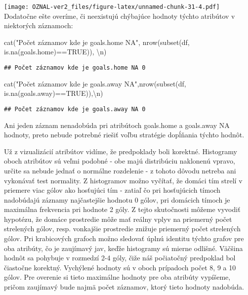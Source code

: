 \documentclass[
]{article}
\newenvironment{Shaded}{\begin{snugshade}}{\end{snugshade}}
\newcommand{\ConstantTok}[1]{\textcolor[rgb]{0.00,0.00,0.00}{#1}}
\newcommand{\FunctionTok}[1]{\textcolor[rgb]{0.00,0.00,0.00}{#1}}
\newcommand{\NormalTok}[1]{#1}
\newcommand{\SpecialCharTok}[1]{\textcolor[rgb]{0.00,0.00,0.00}{#1}}
\newcommand{\StringTok}[1]{\textcolor[rgb]{0.31,0.60,0.02}{#1}}
\begin{document}
\texttt{[image: OZNAL-ver2\_files/figure-latex/unnamed-chunk-31-4.pdf]}
Dodatočne ešte overíme, či neexistujú chýbajúce hodnoty týchto atribútov
v niektorých záznamoch:

\begin{Shaded}
\begin{Highlighting}[]
\FunctionTok{cat}\NormalTok{(}\StringTok{"Počet záznamov kde je goals.home NA"}\NormalTok{, }\FunctionTok{nrow}\NormalTok{(}\FunctionTok{subset}\NormalTok{(df, }\FunctionTok{is.na}\NormalTok{(goals.home)}\SpecialCharTok{==}\ConstantTok{TRUE}\NormalTok{)), }\StringTok{\textquotesingle{}}\SpecialCharTok{\textbackslash{}n}\StringTok{\textquotesingle{}}\NormalTok{)}
\end{Highlighting}
\end{Shaded}

\begin{verbatim}
## Počet záznamov kde je goals.home NA 0
\end{verbatim}

\begin{Shaded}
\begin{Highlighting}[]
\FunctionTok{cat}\NormalTok{(}\StringTok{"Počet záznamov kde je goals.away NA"}\NormalTok{,}\FunctionTok{nrow}\NormalTok{(}\FunctionTok{subset}\NormalTok{(df, }\FunctionTok{is.na}\NormalTok{(goals.away)}\SpecialCharTok{==}\ConstantTok{TRUE}\NormalTok{)),}\StringTok{\textquotesingle{}}\SpecialCharTok{\textbackslash{}n}\StringTok{\textquotesingle{}}\NormalTok{)}
\end{Highlighting}
\end{Shaded}

\begin{verbatim}
## Počet záznamov kde je goals.away NA 0
\end{verbatim}

Ani jeden záznam nenadobúda pri atribútoch goals.home a goals.away NA
hodnoty, preto nebude potrebné riešiť voľbu stratégie dopĺňania týchto
hodnôt.

Už z vizualizácií atribútov vidíme, že predpoklady boli korektné.
Histogramy oboch atribútov sú veľmi podobné - obe majú distribúciu
naklonenú vpravo, určite sa nebude jednať o normálne rozdelenie - z
tohoto dôvodu netreba ani vykonávať test normality. Z histogramov možno
vyčítať, že domáci tím strelí v priemere viac gólov ako hosťujúci tím -
zatiaľ čo pri hosťujúcich tímoch nadobúdajú záznamy najčastejšie hodnotu
0 gólov, pri domácich tímoch je maximálna frekvencia pri hodnote 2 góly.
Z tejto skutočnosti môžeme vyvodiť hypotézu, že domáce prostredie môže
mať reálny vplyv na priemerný počet strelených gólov, resp. vonkajšie
prostredie znižuje priemerný počet strelených gólov. Pri krabicových
grafoch možno sledovať úplnú identitu týchto grafov pre oba atribúty, čo
je zaujímavý jav, keďže histogramy sú mierne odlišné. Väčšina hodnôt sa
pohybuje v rozmedzí 2-4 góly, čiže náš počiatočný predpoklad bol
čiastočne korektný. Vychýlené hodnoty sú v oboch prípadoch počet 8, 9 a
10 gólov. Pre overenie si tieto maximálne hodnoty pre oba atribúty
vypíšeme, pričom zaujímavý bude najmä počet záznamov, ktorý tieto
hodnoty nadobúda.
\end{document}
